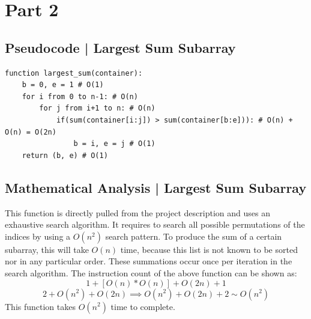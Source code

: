 \documentclass{article}
\begin{document}
\newpage

\section{Part 2}

\subsection{Pseudocode | Largest Sum Subarray}

\begin{verbatim}
function largest_sum(container):
    b = 0, e = 1 # O(1)
    for i from 0 to n-1: # O(n)
        for j from i+1 to n: # O(n)
            if(sum(container[i:j]) > sum(container[b:e])): # O(n) + O(n) = O(2n)
                b = i, e = j # O(1)
    return (b, e) # O(1)
\end{verbatim}

\subsection{Mathematical Analysis | Largest Sum Subarray}
This function is directly pulled from the project description and uses an exhaustive search algorithm.
It requires to search all possible permutations of the indices by using a $O(n^{2})$ search pattern.
To produce the sum of a certain subarray, this will take $O(n)$ time, because this list is not known to be sorted nor in any particular order.
These summations occur once per iteration in the search algorithm.
The instruction count of the above function can be shown as:
$$1 + [O(n) * O(n)] + O(2n) + 1$$
$$2 + O(n^{2}) + O(2n) \implies  O(n^2) + O(2n) + 2 \sim O(n^{2})$$
This function takes $O(n^{2})$ time to complete.
\end{document}
